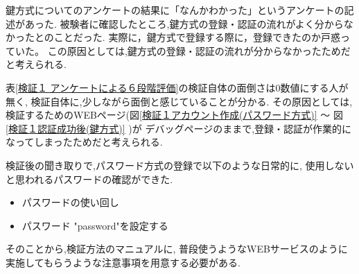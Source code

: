  鍵方式についてのアンケートの結果に「なんかわかった」というアンケートの記述があった.
 被験者に確認したところ,鍵方式の登録・認証の流れがよく分からなかったとのことだった.
 実際に，鍵方式で登録する際に，登録できたのか戸惑っていた。
 この原因としては,鍵方式の登録・認証の流れが分からなかったためだと考えられる.

 表\ref{検証１ アンケートによる６段階評価}の検証自体の面倒さは0数値にする人が無く,
 検証自体に,少しながら面倒と感じていることが分かる.
 その原因としては,検証するためのWEBページ(図\ref{検証１アカウント作成(パスワード方式)} 〜 図\ref{検証１認証成功後(鍵方式)} )が
 デバッグページのままで,登録・認証が作業的になってしまったためだと考えられる.

 検証後の聞き取りで,パスワード方式の登録で以下のような日常的に,
 使用しないと思われるパスワードの確認ができた.
 \begin{itemize}
    \item パスワードの使い回し
    \item パスワード "password"を設定する
 \end{itemize}
 そのことから,検証方法のマニュアルに,
 普段使うようなWEBサービスのように実施してもらうような注意事項を用意する必要がある.

\newpage





